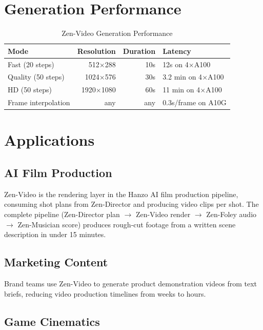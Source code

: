 \documentclass[11pt,a4paper]{article}
\begin{document}
\section{Generation Performance}

\begin{table}[H]
\centering
\begin{tabular}{lrrl}
\toprule
\textbf{Mode} & \textbf{Resolution} & \textbf{Duration} & \textbf{Latency} \\
\midrule
Fast (20 steps) & 512$\times$288 & 10s & 12s on 4$\times$A100 \\
Quality (50 steps) & 1024$\times$576 & 30s & 3.2 min on 4$\times$A100 \\
HD (50 steps) & 1920$\times$1080 & 60s & 11 min on 4$\times$A100 \\
Frame interpolation & any & any & 0.3s/frame on A10G \\
\bottomrule
\end{tabular}
\caption{Zen-Video Generation Performance}
\end{table}

\section{Applications}

\subsection{AI Film Production}

Zen-Video is the rendering layer in the Hanzo AI film production pipeline, consuming shot plans
from Zen-Director and producing video clips per shot. The complete pipeline (Zen-Director plan
$\to$ Zen-Video render $\to$ Zen-Foley audio $\to$ Zen-Musician score) produces rough-cut
footage from a written scene description in under 15 minutes.

\subsection{Marketing Content}

Brand teams use Zen-Video to generate product demonstration videos from text briefs, reducing
video production timelines from weeks to hours.

\subsection{Game Cinematics}
\end{document}
